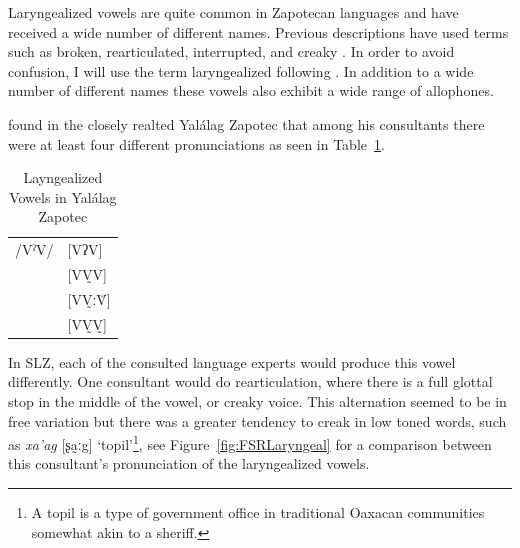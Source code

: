 \documentclass[12pt, letterpaper]{article}
\providecommand{\lsptoprule}{\midrule\toprule}
\providecommand{\lspbottomrule}{\bottomrule\midrule}
\begin{document}
Laryngealized vowels are quite common in Zapotecan languages and have received a wide number of different names. Previous descriptions have used terms such as broken, rearticulated, interrupted, and creaky \citep{longDiccionarioZapotecoSan2005,avelinobecerraTopicsYalalagZapotec2004,avelinoAcousticElectroglottographicAnalyses2010,sonnenscheinDescriptiveGrammarSan2005,adlerAcousticsPhonationTypes2016}. In order to avoid confusion, I will use the term laryngealized following \citet{avelinoAcousticElectroglottographicAnalyses2010}. In addition to a wide number of different names these vowels also exhibit a wide range of allophones. 

\citet{avelinoAcousticElectroglottographicAnalyses2010} found in the closely realted Yalálag Zapotec that among his consultants there were at least four different pronunciations as seen in Table~\ref{tab:laryngeal}. 
\begin{table}[!h]
	\centering
	\caption{Layngealized Vowels in Yalálag Zapotec}
	\label{tab:laryngeal}
	 \begin{tabular}{ll}
	\lsptoprule
	/VˀV/	&  [VʔV]  \\
			&  [VV̰V]   \\
			&  [VV̰ːV̆]  \\
			&  [VV̰V̰]	\\
	\lspbottomrule
	\end{tabular}
\end{table}
In SLZ, each of the consulted language experts would produce this vowel differently. One consultant would do rearticulation, where there is a full glottal stop in the middle of the vowel, or creaky voice. This alternation seemed to be in free variation but there was a greater tendency to creak in low toned words, such as \textit{xa'ag} [ʂa̰ːg] `topil'\footnote{A topil is a type of government office in traditional Oaxacan communities somewhat akin to a sheriff. }, see Figure~\ref{fig:FSRLaryngeal} for a comparison between this consultant's pronunciation of the laryngealized vowels.
\end{document}
